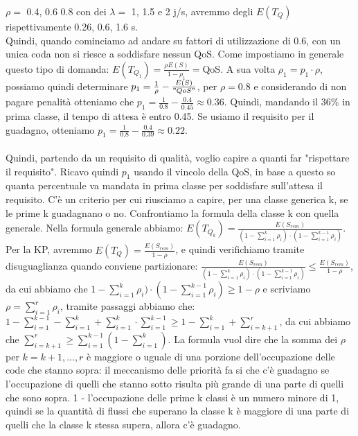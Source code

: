 \documentclass{article}
\begin{document}
$\rho =$ 0.4, 0.6 0.8 con dei $\lambda= $ 1, 1.5 e 2 j/s, avremmo degli $E(T_Q)$ rispettivamente 0.26, 0.6, 1.6 s.\\ Quindi, quando cominciamo ad andare su fattori di utilizzazione di 0.6, con un unica coda non si riesce a soddisfare nessun QoS. Come impostiamo in generale questo tipo di domanda: $E(T_{Q_1}) = \frac{\rho E(S)}{1 - \rho_1} = $QoS. A sua volta $\rho_1 = p_1 \cdot \rho$, possiamo quindi determinare $p_1 = \frac{1}{\rho} - \frac{E(S)}{"QoS"}$, per $\rho = 0.8$ e considerando di non pagare penalità otteniamo che $p_1 = \frac{1}{0.8} - \frac{0.4}{0.45} \approx 0.36$. Quindi, mandando il 36\% in prima classe, il tempo di attesa è entro 0.45. Se usiamo il requisito per il guadagno, otteniamo $p_1 = \frac{1}{0.8} - \frac{0.4}{0.39} \approx 0.22$. \\\\ Quindi, partendo da un requisito di qualità, voglio capire a quanti far "rispettare il requisito". Ricavo quindi $p_1$ usando il vincolo della QoS, in base a questo so quanta percentuale va mandata in prima classe per soddisfare sull'attesa il requisito. C'è un criterio per cui riusciamo a capire, per una classe generica k, se le prime k guadagnano o no. Confrontiamo la formula della classe k con quella generale. Nella formula generale abbiamo: $E(T_{Q_k}) =  \frac{E(S_{rem})}{(1 - \sum\limits_{i=1}^{k} \rho_i)\cdot (1 - \sum\limits_{i=1}^{k-1} \rho_i)}$. Per la KP, avremmo $E(T_Q) = \frac{E(S_{rem})}{1 - \rho}$, e quindi verifichiamo tramite disuguaglianza quando conviene partizionare: $\frac{E(S_{rem})}{(1 - \sum\limits_{i=1}^{k} \rho_i)\cdot (1 - \sum\limits_{i=1}^{k-1} \rho_i)} \leq \frac{E(S_{rem})}{1 - \rho}$, da cui abbiamo che $1 - \sum\limits_{i=1}^{k} \rho_i)\cdot (1 - \sum\limits_{i=1}^{k-1} \rho_i) \geq 1 - \rho$ e scriviamo $\rho = \sum\limits_{i=1}^{r}\rho_i$, tramite passaggi abbiamo che: $1 - \sum\limits_{i=1}^{k-1} - \sum\limits_{i=1}^{k} + \sum\limits_{i=1}^{k} \cdot \sum\limits_{i=1}^{k-1} \geq 1 - \sum\limits_{i=1}^{k} + \sum\limits_{i=k+1}^{r}$, da cui abbiamo che $\sum\limits_{i=k+1}^{r} \geq \sum\limits_{i=1}^{k-1}(1 - \sum\limits_{i=1}^{k})$. La formula vuol dire che la somma dei $\rho$ per $k = k+1,...,r$ è maggiore o uguale di una porzione dell'occupazione delle code che stanno sopra: il meccanismo delle priorità fa si che c'è guadagno se l'occupazione di quelli che stanno sotto risulta più grande di una parte di quelli che sono sopra. 1 - l'occupazione delle prime k classi è un numero minore di 1, quindi se la quantità di flussi che superano la classe k è maggiore di una parte di quelli che la classe k stessa supera, allora c'è guadagno.
\end{document}

